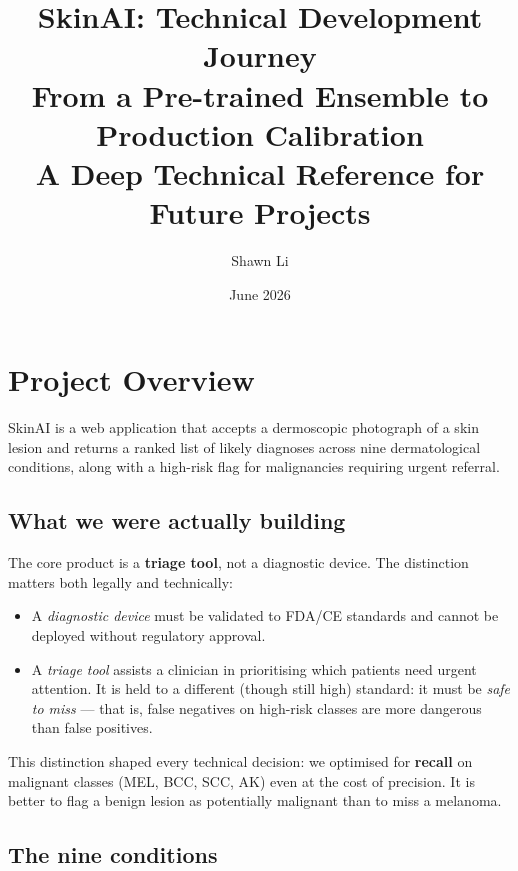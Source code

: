 \documentclass[12pt,a4paper]{article}
\title{
  \textbf{SkinAI: Technical Development Journey}\\[0.5em]
  \large From a Pre-trained Ensemble to Production Calibration\\
  \normalsize A Deep Technical Reference for Future Projects
}
\author{Shawn Li}
\date{June 2026}
\begin{document}
\maketitle
\tableofcontents
\newpage

\section{Project Overview}

SkinAI is a web application that accepts a dermoscopic photograph of a skin lesion and returns
a ranked list of likely diagnoses across nine dermatological conditions, along with a high-risk
flag for malignancies requiring urgent referral.

\subsection{What we were actually building}

The core product is a \textbf{triage tool}, not a diagnostic device. The distinction matters
both legally and technically:

\begin{itemize}
  \item A \emph{diagnostic device} must be validated to FDA/CE standards and cannot be deployed
    without regulatory approval.
  \item A \emph{triage tool} assists a clinician in prioritising which patients need urgent
    attention. It is held to a different (though still high) standard: it must be \emph{safe
    to miss} --- that is, false negatives on high-risk classes are more dangerous than false
    positives.
\end{itemize}

This distinction shaped every technical decision: we optimised for \textbf{recall} on malignant
classes (MEL, BCC, SCC, AK) even at the cost of precision. It is better to flag a benign lesion
as potentially malignant than to miss a melanoma.

\subsection{The nine conditions}
\end{document}
